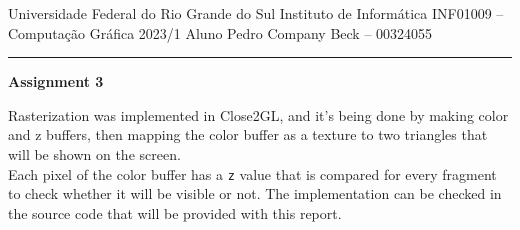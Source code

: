 \documentclass[12pt]{article}
\begin{document}
\noindent
Universidade Federal do Rio Grande do Sul \hfill Instituto de Informática \newline 
INF01009 -- Computação Gráfica \hfill 2023/1 \newline
Aluno \hfill Pedro Company Beck -- 00324055
\rule{\linewidth}{1.pt}

\begin{center}
	\LARGE\textbf{Assignment 3} 
\end{center}

Rasterization was implemented in Close2GL, and it's being done by making color and z buffers, then mapping the color buffer as a texture to two triangles that will be shown on the screen.\\
Each pixel of the color buffer has a \texttt{z} value that is compared for every fragment to check whether it will be visible or not. The implementation can be checked in the source code that will be provided with this report.\\
\end{document}
